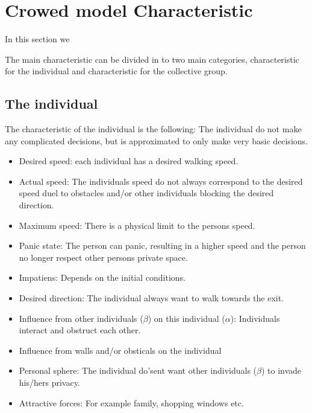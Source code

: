 \section{Crowed model Characteristic}
In this section we 

The main characteristic can be divided in to two main categories, characteristic for the individual and characteristic for the collective group.

\subsection{The individual}
The characteristic of the individual is the following: The individual do not make any complicated decisions, but is approximated to only make very basic decisions.
\begin{itemize}
\item Desired speed: each individual has a desired walking speed.\\

\item Actual speed: The individuals speed do not always correspond to the desired speed duel to obstacles and/or other individuals blocking the desired direction.\\
\item Maximum speed: There is a physical limit to the persons speed.\\
\item Panic state: The person can panic, resulting in a higher speed and the person no longer respect other persons private space.\\
\item Impatiens: Depends on the initial conditions.\\
\item Desired direction: The individual always want to walk towards the exit.\\
\item Influence from other individuals ($\beta$) on this individual ($\alpha$): Individuals interact and obstruct each other.\\
\item Influence from walls and/or obsticals on the individual\\
\item Personal sphere: The individual do'sent want other individuals ($\beta$) to invade his/hers privacy.\\
\item Attractive forces: For example family, shopping windows etc.\\

\end{itemize}


